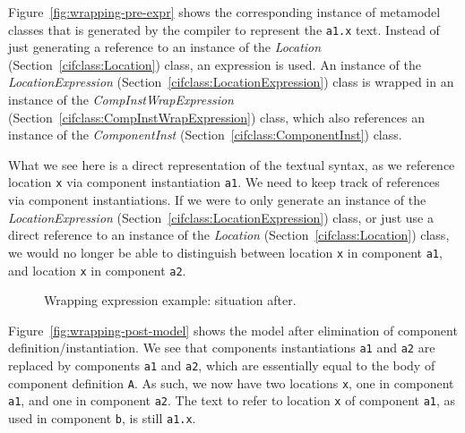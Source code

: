\documentclass{report}
\newcommand{\cifclass}[1]{\textit{#1} (Section~\ref{cifclass:#1})}
\begin{document}
Figure~\ref{fig:wrapping-pre-expr} shows the corresponding instance of
metamodel classes that is generated by the compiler to represent the
\texttt{a1.x} text. Instead of just generating a reference to an instance
of the \cifclass{Location} class, an expression is used. An instance of the
\cifclass{LocationExpression} class is wrapped in an instance of
the \cifclass{CompInstWrapExpression} class, which also references an
instance of the \cifclass{ComponentInst} class.

What we see here is a direct representation of the textual syntax, as we
reference location \texttt{x} via component instantiation \texttt{a1}. We
need to keep track
of references via component instantiations. If we were to only generate an
instance of the \cifclass{LocationExpression} class, or just use a direct
reference to an instance of the \cifclass{Location} class, we would no
longer be able to distinguish between location \texttt{x} in component
\texttt{a1}, and location \texttt{x} in component \texttt{a2}.

\begin{figure}[!ht]
  \centering
  \hfill
  \caption{Wrapping expression example: situation after.}
  \label{fig:wrapping-post}
\end{figure}

Figure~\ref{fig:wrapping-post-model} shows the model after elimination of
component definition/instantiation. We see that components instantiations
\texttt{a1} and \texttt{a2} are replaced by components \texttt{a1} and
\texttt{a2}, which are essentially equal to the body of component definition
\texttt{A}. As such, we now have two locations \texttt{x}, one in component
\texttt{a1}, and one in component \texttt{a2}. The text to refer to location
\texttt{x} of component \texttt{a1}, as used in component \texttt{b}, is
still \texttt{a1.x}.
\end{document}
